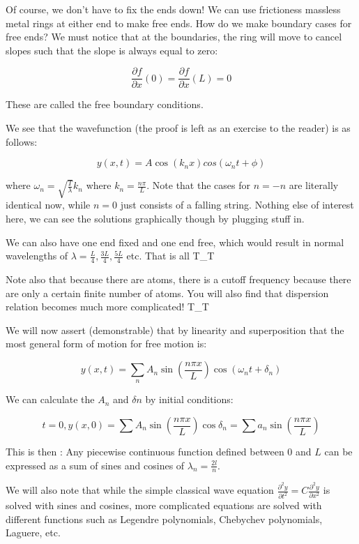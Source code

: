 \documentclass{report}
\begin{document}
Of course, we don't have to fix the ends down! We can use frictioness massless metal rings at either end to make free ends. How do we make boundary cases for free ends? We must notice that at the boundaries, the ring will move to cancel slopes such that the slope is always equal to zero:

$$\frac{\partial f}{\partial x}(0) = \frac{\partial f}{\partial x}(L) = 0$$

These are called the free boundary conditions.

We see that the wavefunction (the proof is left as an exercise to the reader) is as follows:

$$y(x,t) = A\cos(k_nx)cos(\omega_nt + \phi)$$

where $\omega_n = \sqrt{\frac{T}{\lambda}}k_n$ where $k_n = \frac{n\pi}{L}$. Note that the cases for $n = -n$ are literally identical now, while $n=0$ just consists of a falling string. Nothing else of interest here, we can see the solutions graphically though by plugging stuff in.

We can also have one end fixed and one end free, which would result in normal wavelengths of $\lambda = \frac{L}{4}, \frac{3L}{4}, \frac{5L}{4}$ etc. That is all T\_T

Note also that because there are atoms, there is a cutoff frequency because there are only a certain finite number of atoms. You will also find that dispersion relation becomes much more complicated! T\_T

We will now assert (demonstrable) that by linearity and superposition that the most general form of motion for free motion is:

$$y(x,t) = \sum_n{A_n\sin\left(\frac{n\pi x}{L}\right) \cos\left(\omega_nt + \delta_n\right)}$$

We can calculate the $A_n$ and $\delta n$ by initial conditions:

$$t=0, y(x,0) = \sum{A_n\sin\left(\frac{n\pi x}{L}\right)\cos\delta_n} = \sum{a_n\sin\left(\frac{n\pi x}{L}\right)}$$

This is then : Any piecewise continuous function defined between $0$ and $L$ can be expressed as a sum of sines and cosines of $\lambda_n = \frac{2l}{n}$.

We will also note that while the simple classical wave equation $\frac{\partial^2 y}{\partial t^2} = C \frac{\partial^2 y}{\partial x^2}$ is solved with sines and cosines, more complicated equations are solved with different functions such as Legendre polynomials, Chebychev polynomials, Laguere, etc.
\end{document}
